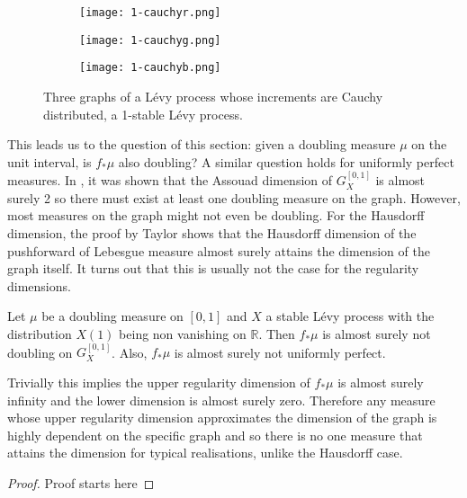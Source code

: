 \begin{figure}[htbp]
	\centering
	\begin{subfigure}{0.3\textwidth}
		\centering
		\texttt{[image: 1-cauchyr.png]}
	\end{subfigure}%
	\begin{subfigure}{.3\textwidth}
		\centering
		\texttt{[image: 1-cauchyg.png]}
	\end{subfigure}%
	\begin{subfigure}{.3\textwidth}
		\centering
		\texttt{[image: 1-cauchyb.png]}
	\end{subfigure}
	\caption{Three graphs of a L\'evy process whose increments are Cauchy distributed, a 1-stable L\'evy process.}
	\label{fig:cauchy}
\end{figure}


This leads us to the question of this section: given a doubling measure $\mu$ on the unit interval, is $f_*\mu$ also doubling? A similar question holds for uniformly perfect measures. In \cite{howroyd-yu}, it was shown that the Assouad dimension of $G_X^{[0,1]}$ is almost surely 2 so there must exist at least one doubling measure on the graph. However, most measures on the graph might not even be doubling. For the Hausdorff dimension, the proof by Taylor shows that the Hausdorff dimension of the pushforward of Lebesgue measure almost surely attains the dimension of the graph itself. It turns out that this is usually not the case for the regularity dimensions.

\begin{theorem}\label{brownianthm}
	Let $\mu$ be a doubling measure on $[0,1]$ and $X$ a stable L\'evy process with the distribution $X(1)$ being non vanishing on $\mathbb{R}$. Then $f_*\mu$ is almost surely not doubling on $G_X^{[0,1]}$. Also, $f_*\mu$ is almost surely not uniformly perfect.
\end{theorem}


Trivially this implies the upper regularity dimension of $f_*\mu$ is almost surely infinity and the lower dimension is almost surely zero. Therefore any measure whose upper regularity dimension approximates the dimension of the graph is highly dependent on the specific graph and so there is no one measure that attains the dimension for typical realisations, unlike the Hausdorff case. 


\begin{proof}
    Proof starts here
\end{proof}

